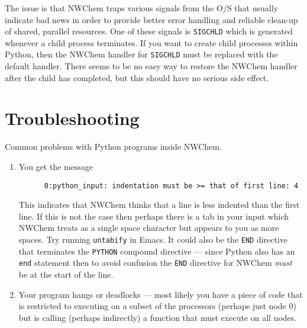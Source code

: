 The issue is that NWChem traps various signals from the O/S that
usually indicate bad news in order to provide better error handling
and reliable clean-up of shared, parallel resources.  One of these
signals is \verb+SIGCHLD+ which is generated whenever a child process
terminates.  If you want to create child processes within Python, then
the NWChem handler for \verb+SIGCHLD+ must be replaced with the
default handler.  There seems to be no easy way to restore the
NWChem handler after the child has completed, but this should have
no serious side effect.

\section{Troubleshooting}

Common problems with Python programs inside NWChem.

\begin{enumerate}
\item You get the message
\begin{verbatim}
      0:python_input: indentation must be >= that of first line: 4
\end{verbatim}
This indicates that NWChem thinks that a line is less indented than
the first line.  If this is not the case then perhaps there is a tab
in your input which NWChem treats as a single space character but
appears to you as more spaces. Try running \verb+untabify+ in Emacs.
It could also be the \verb+END+ directive that terminates the
\verb+PYTHON+ compound directive --- since Python also has an
\verb+end+ statement then to avoid confusion the \verb+END+ directive
for NWChem {\em must} be at the start of the line.

\item Your program hangs or deadlocks --- most likely you have a piece
of code that is restricted to executing on a subset of the processors
(perhaps just node 0) but is calling (perhaps indirectly) a function
that must execute on all nodes.  

\end{enumerate}
